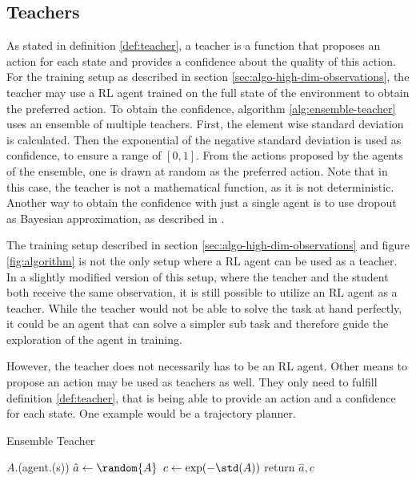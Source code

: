 \subsection{Teachers}
\label{sec:teachers}

As stated in definition \ref{def:teacher}, a teacher is a function that proposes an action for each state and provides a confidence about the quality of this action. For the training setup as described in section \ref{sec:algo-high-dim-observations}, the teacher may use a RL agent trained on the full state of the environment to obtain the preferred action. To obtain the confidence, algorithm \ref{alg:ensemble-teacher} uses an ensemble of multiple teachers. First, the element wise standard deviation is calculated. Then the exponential of the negative standard deviation is used as confidence, to ensure a range of $[0,1]$. From the actions proposed by the agents of the ensemble, one is drawn at random as the preferred action. Note that in this case, the teacher is not a mathematical function, as it is not deterministic. Another way to obtain the confidence with just a single agent is to use dropout as Bayesian approximation, as described in \cite{galDropoutBayesianApproximation2016}.

The training setup described in section \ref{sec:algo-high-dim-observations} and figure \ref{fig:algorithm} is not the only setup where a RL agent can be used as a teacher. In a slightly modified version of this setup, where the teacher and the student both receive the same observation, it is still possible to utilize an RL agent as a teacher. While the teacher would not be able to solve the task at hand perfectly, it could be an agent that can solve a simpler sub task and therefore guide the exploration of the agent in training.

However, the teacher does not necessarily has to be an RL agent. Other means to propose an action may be used as teachers as well. They only need to fulfill definition \ref{def:teacher}, that is being able to provide an action and a confidence for each state. One example would be a trajectory planner.

\begin{algorithm}[btp]
    \caption{Ensemble Teacher}
    \label{alg:ensemble-teacher}

    \DontPrintSemicolon
    

    
    \BlankLine
    {$A$.\append(agent.\predict(s))}
    $\hat{a} \leftarrow\random{A}$\;
    $c \leftarrow\exp(-\std(A))$\;
    return $\hat{a}, c$\;
\end{algorithm}


